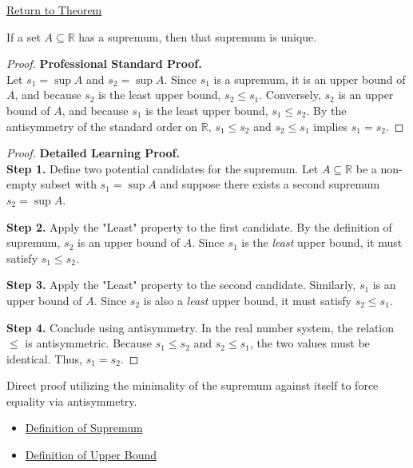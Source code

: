 \newpage
{}
\label{prf:uniqueness-of-the-supremum}

\begin{remark*}[Return]
\hyperref[prop:uniqueness-of-the-supremum]{Return to Theorem}
\end{remark*}

\begin{theorem*}
If a set $A \subseteq \mathbb{R}$ has a supremum, then that supremum is unique.
\end{theorem*}

\begin{proof}
\textbf{Professional Standard Proof.}~\\
Let $s_1 = \sup A$ and $s_2 = \sup A$. Since $s_1$ is a supremum, it is an upper bound of $A$, and because $s_2$ is the least upper bound, $s_2 \le s_1$. Conversely, $s_2$ is an upper bound of $A$, and because $s_1$ is the least upper bound, $s_1 \le s_2$. By the antisymmetry of the standard order on $\mathbb{R}$, $s_1 \le s_2$ and $s_2 \le s_1$ implies $s_1 = s_2$.
\end{proof}

\begin{proof}
\textbf{Detailed Learning Proof.}~\\

\textbf{Step 1.} Define two potential candidates for the supremum.
Let $A \subseteq \mathbb{R}$ be a non-empty subset with $s_1 = \sup A$ and suppose there exists a second supremum $s_2 = \sup A$.

\textbf{Step 2.} Apply the "Least" property to the first candidate.
By the definition of supremum, $s_2$ is an upper bound of $A$. Since $s_1$ is the \textit{least} upper bound, it must satisfy $s_1 \le s_2$.

\textbf{Step 3.} Apply the "Least" property to the second candidate.
Similarly, $s_1$ is an upper bound of $A$. Since $s_2$ is also a \textit{least} upper bound, it must satisfy $s_2 \le s_1$.

\textbf{Step 4.} Conclude using antisymmetry.
In the real number system, the relation $\le$ is antisymmetric. Because $s_1 \le s_2$ and $s_2 \le s_1$, the two values must be identical. Thus, $s_1 = s_2$.
\end{proof}

\begin{remark*}
Direct proof utilizing the minimality of the supremum against itself to force equality via antisymmetry.
\end{remark*}

\begin{remark*}[Dependencies]\hfill
\begin{itemize}
  \item \hyperref[def:supremum]{Definition of Supremum}
  \item \hyperref[def:upper-bound]{Definition of Upper Bound}
\end{itemize}
\end{remark*}
